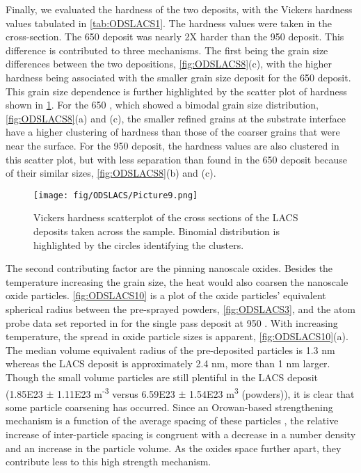 	 Finally, we evaluated the hardness of the two deposits, with the Vickers hardness values tabulated in \ref{tab:ODSLACS1}. The hardness values were taken in the cross-section. The 650 \celsius{} deposit was nearly 2X harder than the 950 \celsius{} deposit. This difference is contributed to three mechanisms. The first being the grain size differences between the two depositions, \ref{fig:ODSLACS8}(c), with the higher hardness being associated with the smaller grain size deposit for the 650 \celsius{} deposit. This grain size dependence is further highlighted by the scatter plot of hardness shown in \ref{fig:ODSLACS9}. For the 650 \celsius{}, which showed a bimodal grain size distribution, \ref{fig:ODSLACS8}(a) and (c), the smaller refined grains at the substrate interface have a higher clustering of hardness than those of the coarser grains that were near the surface. For the 950 \celsius{} deposit, the hardness values are also clustered in this scatter plot, but with less separation than found in the 650 \celsius{} deposit because of their similar sizes, \ref{fig:ODSLACS8}(b) and (c). 




			\begin{figure}
				\centering
				\texttt{[image: fig/ODSLACS/Picture9.png]}
				\caption[Vickers hardness scatterplot of the cross sections of the LACS deposits taken across the sample.]{Vickers hardness scatterplot of the cross sections of the LACS deposits taken across the sample. Binomial distribution is highlighted by the circles identifying the clusters.}
				\label{fig:ODSLACS9}
			\end{figure}


	The second contributing factor are the pinning nanoscale oxides. Besides the temperature increasing the grain size, the heat would also coarsen the nanoscale oxide particles. \ref{fig:ODSLACS10} is a plot of the oxide particles’ equivalent spherical radius between the pre-sprayed powders, \ref{fig:ODSLACS3}, and the atom probe data set reported in \cite{RN383} for the single pass deposit at 950 \celsius{}. With increasing temperature, the spread in oxide particle sizes is apparent, \ref{fig:ODSLACS10}(a). The median volume equivalent radius of the pre-deposited particles is 1.3 nm whereas the LACS deposit is approximately 2.4 nm, more than 1 nm larger. Though the small volume particles are still plentiful in the LACS deposit (1.85E23 $ \pm $  1.11E23 m\textsuperscript{-3} \cite{RN383} versus 6.59E23 $ \pm $  1.54E23 m\textsuperscript{3 }(powders)), it is clear that some particle coarsening has occurred. Since an Orowan-based strengthening mechanism is a function of the average spacing of these particles \cite{RN119,RN3414}, the relative increase of inter-particle spacing is congruent with a decrease in a number density and an increase in the particle volume. As the oxides space further apart, they contribute less to this high strength mechanism. 



